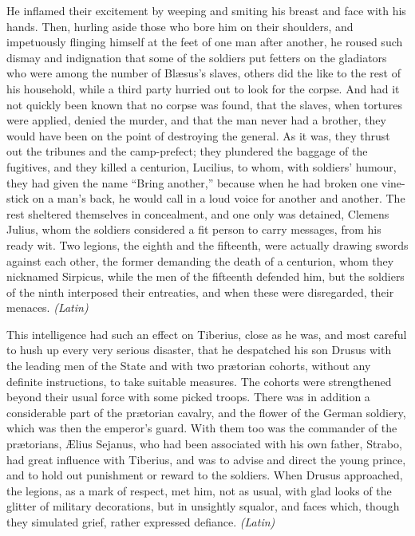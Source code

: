 He inflamed their excitement by weeping and smiting his breast and face with his hands. Then, hurling aside those who bore him on their shoulders, and impetuously flinging himself at the feet of one man after another, he roused such dismay and indignation that some of the soldiers put fetters on the gladiators who were among the number of Blæsus's slaves, others did the like to the rest of his household, while a third party hurried out to look for the corpse. And had it not quickly been known that no corpse was found, that the slaves, when tortures were applied, denied the murder, and that the man never had a brother, they would have been on the point of destroying the general. As it was, they thrust out the tribunes and the camp-prefect; they plundered the baggage of the fugitives, and they killed a centurion, Lucilius, to whom, with soldiers' humour, they had given the name ``Bring another,'' because when he had broken one vine-stick on a man's back, he would call in a loud voice for another and another. The rest sheltered themselves in concealment, and one only was detained, Clemens Julius, whom the soldiers considered a fit person to carry messages, from his ready wit. Two legions, the eighth and the fifteenth, were actually drawing swords against each other, the former demanding the death of a centurion, whom they nicknamed Sirpicus, while the men of the fifteenth defended him, but the soldiers of the ninth interposed their entreaties, and when these were disregarded, their menaces. \emph{(Latin)}


This intelligence had such an effect on Tiberius, close as he was, and most careful to hush up every very serious disaster, that he despatched his son Drusus with the leading men of the State and with two prætorian cohorts, without any definite instructions, to take suitable measures. The cohorts were strengthened beyond their usual force with some picked troops. There was in addition a considerable part of the prætorian cavalry, and the flower of the German soldiery, which was then the emperor's guard. With them too was the commander of the prætorians, Ælius Sejanus, who had been associated with his own father, Strabo, had great influence with Tiberius, and was to advise and direct the young prince, and to hold out punishment or reward to the soldiers. When Drusus approached, the legions, as a mark of respect, met him, not as usual, with glad looks of the glitter of military decorations, but in unsightly squalor, and faces which, though they simulated grief, rather expressed defiance. \emph{(Latin)}

